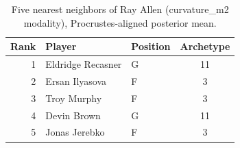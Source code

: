 \begin{table}[htbp]
  \centering\small
  \begin{tabular}{rllc}
    \toprule
    Rank & Player & Position & Archetype \\
    \midrule
    1 & Eldridge Recasner & G & 11 \\
    2 & Ersan Ilyasova & F & 3 \\
    3 & Troy Murphy & F & 3 \\
    4 & Devin Brown & G & 11 \\
    5 & Jonas Jerebko & F & 3 \\
    \bottomrule
  \end{tabular}
  \caption{Five nearest neighbors of Ray Allen (curvature_m2 modality), Procrustes-aligned posterior mean.}
  \label{tab:Ray_Allen_neighbors_curvature_m2}
\end{table}


